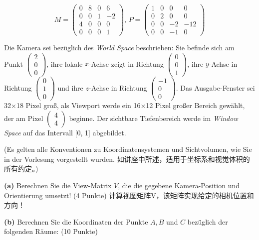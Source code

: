 \documentclass[fleqn]{article}
\begin{document}
$$M=\begin{pmatrix}
    0&8&0&6\\
    0&0&1&-2\\
    4&0&0&0\\
    0&0&0&1
\end{pmatrix},\,P=\begin{pmatrix}
    1&0&0&0\\
    0&2&0&0\\
    0&0&-2&-12\\
    0&0&-1&0
\end{pmatrix}$$

Die Kamera sei bezüglich des \textit{World Space} beschrieben: Sie befinde sich am Punkt $\begin{pmatrix}
    2\\0\\0
\end{pmatrix}$, ihre lokale $x$-Achse zeigt in Richtung $\begin{pmatrix}
    0\\0\\1
\end{pmatrix}$, ihre $y$-Achse in Richtung $\begin{pmatrix}
    0\\1\\0
\end{pmatrix}$ und ihre $z$-Achse in Richtung $\begin{pmatrix}
    -1\\0\\0
\end{pmatrix}$. Das Ausgabe-Fenster sei 32$\times$18 Pixel groß, als Viewport werde ein 16$\times$12 Pixel großer Bereich gewählt, der am Pixel
$\begin{pmatrix}
    4\\4
\end{pmatrix}$ beginne. Der sichtbare Tiefenbereich werde im \textit{Window Space} auf das Intervall [0, 1] abgebildet.

(Es gelten alle Konventionen zu Koordinatensystemen und Sichtvolumen, wie Sie in der Vorlesung vorgestellt wurden. 如讲座中所述，适用于坐标系和视觉体积的所有约定。)

\indent\textbf{(a)} Berechnen Sie die View-Matrix $V$, die die gegebene Kamera-Position und Orientierung umsetzt! (4 Punkte)
计算视图矩阵V，该矩阵实现给定的相机位置和方向！

\indent\textbf{(b)} Berechnen Sie die Koordinaten der Punkte $A, B$ und $C$ bezüglich der folgenden Räume: (10 Punkte)
\end{document}
